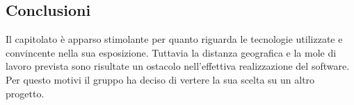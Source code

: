 \subsection{Conclusioni}
Il capitolato è apparso stimolante per quanto riguarda le tecnologie utilizzate e convincente nella sua esposizione. Tuttavia la distanza geografica e la
mole di lavoro prevista sono risultate un ostacolo nell'effettiva realizzazione del software. Per questo motivi il gruppo ha deciso di vertere la sua scelta
su un altro progetto.
